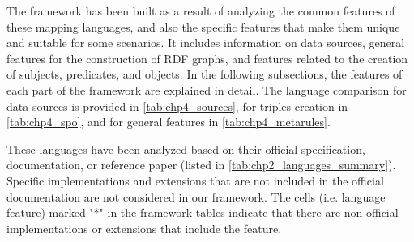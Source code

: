 The framework has been built as a result of analyzing the common features of these mapping languages, and also the specific features that make them unique and suitable for some scenarios. It includes information on data sources, general features for the construction of RDF graphs, and features related to the creation of subjects, predicates, and objects. In the following subsections, the features of each part of the framework are explained in detail. The language comparison for data sources is provided in \cref{tab:chp4_sources}, for triples creation in \cref{tab:chp4_spo}, and for general features in \cref{tab:chp4_metarules}. 

These languages have been analyzed based on their official specification, documentation, or reference paper (listed in \cref{tab:chp2_languages_summary}). Specific implementations and extensions that are not included in the official documentation are not considered in our framework. The cells (i.e. language feature) marked "*"  in the framework tables indicate that there are non-official implementations or extensions that include the feature.



